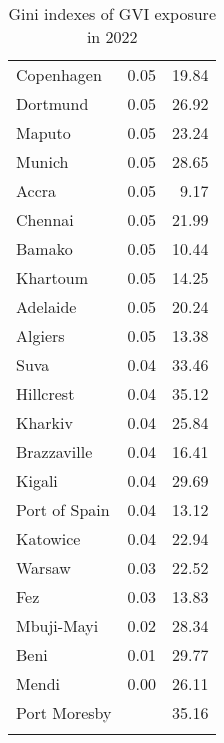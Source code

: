 \begin{longtable}{lrr}
  Copenhagen & 0.05 & 19.84 \\ 
  Dortmund & 0.05 & 26.92 \\ 
  Maputo & 0.05 & 23.24 \\ 
  Munich & 0.05 & 28.65 \\ 
  Accra & 0.05 & 9.17 \\ 
  Chennai & 0.05 & 21.99 \\ 
  Bamako & 0.05 & 10.44 \\ 
  Khartoum & 0.05 & 14.25 \\ 
  Adelaide & 0.05 & 20.24 \\ 
  Algiers & 0.05 & 13.38 \\ 
  Suva & 0.04 & 33.46 \\ 
  Hillcrest & 0.04 & 35.12 \\ 
  Kharkiv & 0.04 & 25.84 \\ 
  Brazzaville & 0.04 & 16.41 \\ 
  Kigali & 0.04 & 29.69 \\ 
  Port of Spain & 0.04 & 13.12 \\ 
  Katowice & 0.04 & 22.94 \\ 
  Warsaw & 0.03 & 22.52 \\ 
  Fez & 0.03 & 13.83 \\ 
  Mbuji-Mayi & 0.02 & 28.34 \\ 
  Beni & 0.01 & 29.77 \\ 
  Mendi & 0.00 & 26.11 \\ 
  Port Moresby &  & 35.16 \\ 
   \hline
\hline
\caption{Gini indexes of GVI exposure in 2022} 
\label{tab:gini}
\end{longtable}
